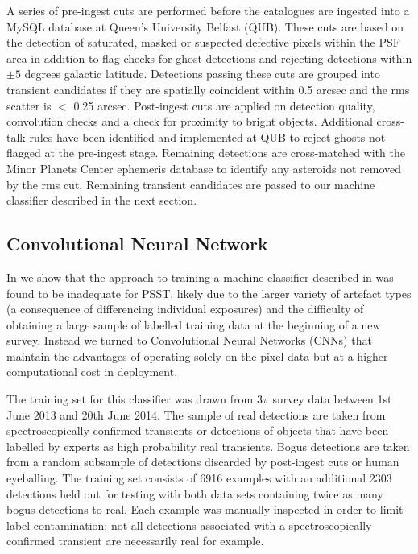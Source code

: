 \documentclass[a4paper,fleqn,usenatbib]{mnras}
\begin{document}
A series of pre-ingest cuts are performed before the catalogues are ingested into a MySQL database at Queen's University Belfast (QUB).  These cuts are based on the detection of saturated, masked or suspected defective pixels within the PSF area in addition to flag checks for ghost detections and rejecting detections within $\pm 5$ degrees galactic latitude. Detections passing these cuts are grouped into transient candidates if they are spatially coincident within 0.5 arcsec and the rms scatter is $<$ 0.25 arcsec.  Post-ingest cuts are applied on detection quality, convolution checks and a check for proximity to bright objects.  Additional cross-talk rules have been identified and implemented at QUB to reject ghosts
not flagged at the pre-ingest stage.  Remaining detections are cross-matched with the Minor Planets Center ephemeris database to identify any asteroids not 
removed by the rms cut.  Remaining transient candidates are passed to our machine classifier described in the next section.

\subsection{Convolutional Neural Network}
\label{sec:cnn}

In \citet{Wright16} we show that the approach to training a machine classifier described in \citet{Wright15} was found to be inadequate for PSST, likely due to the larger variety of artefact types (a consequence of differencing individual exposures) and the difficulty  of obtaining a large sample of labelled training data at the beginning of a new survey.  Instead we turned to Convolutional Neural Networks (CNNs) that maintain the advantages of operating solely on the pixel data but at a higher computational cost in deployment.  

The training set for this classifier was drawn from $3\pi$ survey data between 1st June 2013 and 20th June 2014.  The sample of real detections are taken from spectroscopically confirmed transients or detections of objects that have been labelled by experts as high probability real transients.  Bogus detections are taken from a random subsample of detections discarded by post-ingest cuts or human eyeballing.  The training set consists of 6916 examples with an additional 2303 detections held out for testing with both data sets containing twice as many bogus detections to real. Each example was manually inspected in order to limit label contamination; not all detections associated with a spectroscopically confirmed transient are necessarily real for example.
\end{document}
